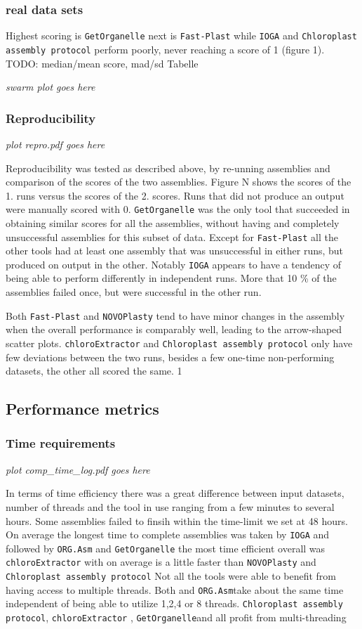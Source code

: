 \documentclass{bmcart}
\newcommand{\formatprogramnames}[1]{\texttt{#1}}
\newcommand{\ce}{\formatprogramnames{chloroExtractor}}
\newcommand{\oa}{\formatprogramnames{ORG.Asm}}
\newcommand{\fp}{\formatprogramnames{Fast-Plast}}
\newcommand{\ioga}{\formatprogramnames{IOGA}}
\newcommand{\np}{\formatprogramnames{NOVOPlasty}}
\newcommand{\go}{\formatprogramnames{GetOrganelle}}
\newcommand{\cassp}{\formatprogramnames{Chloroplast assembly protocol}}
\begin{document}
\subsubsection*{real data sets}
Highest scoring is \go{} next is \fp{} while \ioga{} and \cassp{} perform poorly, never reaching a score of 1 (figure 1). TODO: median/mean score, mad/sd Tabelle

\textit{swarm plot goes here}


\subsubsection*{Reproducibility}
\textit{plot repro.pdf goes here}

Reproducibility was tested as described above, by re-unning assemblies and comparison of the scores of the two assemblies. Figure N shows the scores of the 1. runs versus the scores of the 2. scores. Runs that did not produce an output were manually scored with 0. 
\go{}  was the only tool that succeeded in obtaining similar scores for all the assemblies, without having and completely unsuccessful assemblies for this subset of data. Except for \fp{} all the other tools had at least one assembly that was unsuccessful in either runs, but produced on output in the other.  Notably \ioga{} appears to have a tendency of being able to perform differently in independent runs. More that 10 \% of the assemblies failed once, but were successful in the other run.

Both \fp{} and \np{} tend to have minor changes in the assembly when the overall performance is comparably well, leading to the arrow-shaped scatter plots. \ce{} and \cassp{} only have few deviations between the two runs, besides a few one-time non-performing datasets, the other all scored the same.
1

\subsection*{Performance metrics}

\subsubsection*{Time requirements}

\textit{plot comp\_time\_log.pdf goes here}

In terms of time efficiency there was a great difference between input datasets, number of threads and the tool in use ranging from a few minutes to several hours. Some assemblies failed to finsih within the time-limit we set at 48 hours. 
On average the longest time to complete assemblies was taken by \ioga{} and \fb{} followed by \oa{} and \go{} the most time efficient overall was \ce{} with on average is a little faster than \np{} and \cassp{}
Not all the tools were able to benefit from having access to multiple threads. Both \no and \oa take about the same time independent of being able to utilize 1,2,4 or 8 threads. \cassp{}, \ce{} , \go and \fb{} all profit from multi-threading
 
\end{document}
